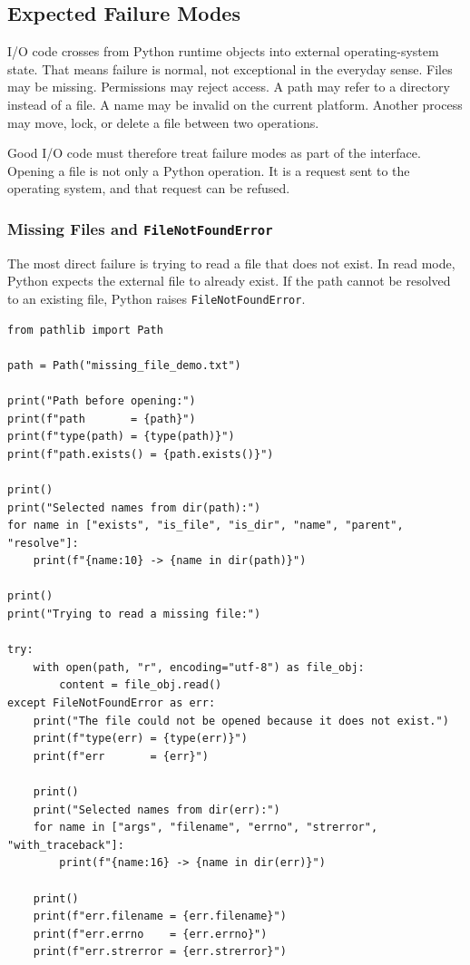 \subsection{Expected Failure Modes}

I/O code crosses from Python runtime objects into external operating-system state. That means failure is normal, not exceptional in the everyday sense. Files may be missing. Permissions may reject access. A path may refer to a directory instead of a file. A name may be invalid on the current platform. Another process may move, lock, or delete a file between two operations.

Good I/O code must therefore treat failure modes as part of the interface. Opening a file is not only a Python operation. It is a request sent to the operating system, and that request can be refused.

\subsubsection{Missing Files and \texttt{FileNotFoundError}}

The most direct failure is trying to read a file that does not exist. In read mode, Python expects the external file to already exist. If the path cannot be resolved to an existing file, Python raises \texttt{FileNotFoundError}.

\begin{verbatim}
from pathlib import Path

path = Path("missing_file_demo.txt")

print("Path before opening:")
print(f"path       = {path}")
print(f"type(path) = {type(path)}")
print(f"path.exists() = {path.exists()}")

print()
print("Selected names from dir(path):")
for name in ["exists", "is_file", "is_dir", "name", "parent", "resolve"]:
    print(f"{name:10} -> {name in dir(path)}")

print()
print("Trying to read a missing file:")

try:
    with open(path, "r", encoding="utf-8") as file_obj:
        content = file_obj.read()
except FileNotFoundError as err:
    print("The file could not be opened because it does not exist.")
    print(f"type(err) = {type(err)}")
    print(f"err       = {err}")

    print()
    print("Selected names from dir(err):")
    for name in ["args", "filename", "errno", "strerror", "with_traceback"]:
        print(f"{name:16} -> {name in dir(err)}")

    print()
    print(f"err.filename = {err.filename}")
    print(f"err.errno    = {err.errno}")
    print(f"err.strerror = {err.strerror}")
\end{verbatim}

